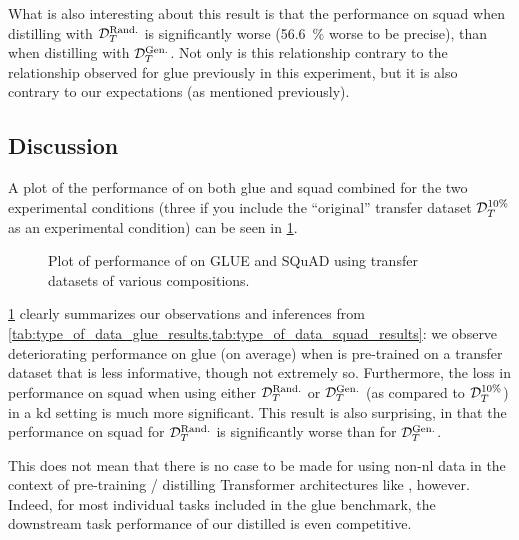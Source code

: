 What is also interesting about this result is that the performance on \gls{squad} when distilling with  $\mathcal{D}_T^{\text{Rand.}}$ is significantly worse (\SI{56.6}{\percent} worse to be precise), than when distilling with $\mathcal{D}_T^{\text{Gen.}}$. Not only is this relationship contrary to the relationship observed for \gls{glue} previously in this experiment, but it is also contrary to our expectations (as mentioned previously).



\subsection{Discussion}
\label{subsec:composition_of_transfer_dataset_discussion}
A plot of the performance of \bertstudent on both \gls{glue} and \gls{squad} combined for the two experimental conditions (three if you include the ``original'' transfer dataset $\mathcal{D}_T^{10\%}$ as an experimental condition) can be seen in \cref{fig:type_of_data_barplot}.

\begin{figure}
    \begin{center}
        
    \end{center}
    \caption[Plot of performance on GLUE and SQuAD using differently composed transfer datasets]{Plot of performance of \bertstudent on GLUE and SQuAD using transfer datasets of various compositions.}
    \label{fig:type_of_data_barplot}
\end{figure}

\cref{fig:type_of_data_barplot} clearly summarizes our observations and inferences from \cref{tab:type_of_data_glue_results,tab:type_of_data_squad_results}: we observe deteriorating performance on \gls{glue} (on average) when \bertstudent is pre-trained on a transfer dataset that is less informative, though not extremely so. Furthermore, the loss in performance on \gls{squad} when using either $\mathcal{D}_T^{\text{Rand.}}$ or $\mathcal{D}_T^{\text{Gen.}}$ (as compared to $\mathcal{D}_T^{10\%}$) in a \gls{kd} setting is much more significant. This result is also surprising, in that the performance on \gls{squad} for $\mathcal{D}_T^{\text{Rand.}}$ is significantly worse than for $\mathcal{D}_T^{\text{Gen.}}$.

This does not mean that there is no case to be made for using non-\gls{nl} data in the context of pre-training / distilling Transformer architectures like \bertbase, however. Indeed, for most individual tasks included in the \gls{glue} benchmark, the downstream task performance of our distilled \bertstudent is even competitive.

